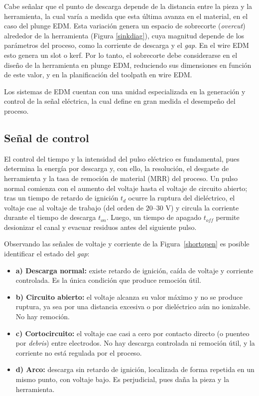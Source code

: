 Cabe señalar que el punto de descarga depende de la distancia entre la pieza y la herramienta, la cual varía a medida que esta última avanza en el material, en el caso del plunge EDM. Esta variación genera un espacio de sobrecorte (\textit{overcut}) alrededor de la herramienta (Figura \ref{sinkdiag}), cuya magnitud depende de los parámetros del proceso, como la corriente de descarga y el \textit{gap}. En el wire EDM esto genera un slot o kerf. Por lo tanto, el sobrecorte debe considerarse en el diseño de la herramienta en plunge EDM, reduciendo sus dimensiones en función de este valor, y en la planificación del toolpath en wire EDM.

 Los sistemas de EDM cuentan con una unidad especializada en la generación y control de la señal eléctrica, la cual define en gran medida el desempeño del proceso.

\subsection{Señal de control}

El control del tiempo y la intensidad del pulso eléctrico es fundamental, pues determina la energía por descarga y, con ello, la resolución, el desgaste de herramienta y la tasa de remoción de material (MRR) del proceso. Un pulso normal comienza con el aumento del voltaje hasta el voltaje de circuito abierto; tras un tiempo de retardo de ignición $t_d$ ocurre la ruptura del dieléctrico, el voltaje cae al voltaje de trabajo (del orden de $20$--$30$ V) y circula la corriente durante el tiempo de descarga $t_{on}$. Luego, un tiempo de apagado $t_{off}$ permite desionizar el canal y evacuar residuos antes del siguiente pulso.

Observando las señales de voltaje y corriente de la Figura~\ref{shortopen} es posible identificar el estado del \textit{gap}:
\begin{itemize}
	\item \textbf{a) Descarga normal:} existe retardo de ignición, caída de voltaje y corriente controlada. Es la única condición que produce remoción útil.
	\item \textbf{b) Circuito abierto:} el voltaje alcanza su valor máximo y no se produce ruptura, ya sea por una distancia excesiva o por dieléctrico aún no ionizable. No hay remoción.
	\item \textbf{c) Cortocircuito:} el voltaje cae casi a cero por contacto directo (o puenteo por \textit{debris}) entre electrodos. No hay descarga controlada ni remoción útil, y la corriente no está regulada por el proceso.
	\item \textbf{d) Arco:} descarga sin retardo de ignición, localizada de forma repetida en un mismo punto, con voltaje bajo. Es perjudicial, pues daña la pieza y la herramienta.
\end{itemize}


